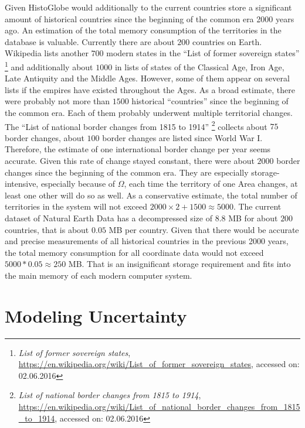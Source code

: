 Given HistoGlobe would additionally to the current countries store a significant amount of historical countries since the beginning of the common era 2000 years ago. An estimation of the total memory consumption of the territories in the database is valuable. Currently there are about $200$ countries on Earth. Wikipedia lists another $700$ modern states in the ``List of former sovereign states''
\footnote{
  \emph{List of former sovereign states},
  \url{https://en.wikipedia.org/wiki/List_of_former_sovereign_states},
  accessed on: 02.06.2016
}
and additionally about $1000$ in lists of states of the Classical Age, Iron Age, Late Antiquity and the Middle Ages. However, some of them appear on several lists if the empires have existed throughout the Ages. As a broad estimate, there were probably not more than $1500$ historical ``countries'' since the beginning of the common era. Each of them probably underwent multiple territorial changes. The ``List of national border changes from 1815 to 1914''
\footnote{
  \emph{List of national border changes from 1815 to 1914},
  \url{https://en.wikipedia.org/wiki/List_of_national_border_changes_from_1815_to_1914},
  accessed on: 02.06.2016
}
collects about $75$ border changes, about $100$ border changes are listed since World War I. Therefore, the estimate of one international border change per year seems accurate. Given this rate of change stayed constant, there were about $2000$ border changes since the beginning of the common era. They are especially storage-intensive, especially because of $\Omega$, each time the territory of one Area changes, at least one other will do so as well. As a conservative estimate, the total number of territories in the system will not exceed $2000 \times 2 + 1500 \approx 5000$. The current dataset of Natural Earth Data has a decompressed size of $8.8$ MB for about $200$ countries, that is about $0.05$ MB per country. Given that there would be accurate and precise measurements of all historical countries in the previous 2000 years, the total memory consumption for all coordinate data would not exceed $5000 * 0.05 \approx 250$ MB. That is an insignificant storage requirement and fits into the main memory of each modern computer system.



\section{Modeling Uncertainty} %
\label{sec:modelling_uncertainty}

